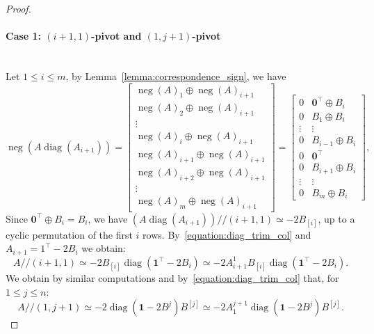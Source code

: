 \documentclass[11pt,a4paper]{amsart}
\renewcommand*{\leq}{\leqslant}
\theoremstyle{plain}
\theoremstyle{definition}
\newcommand{\trim}{/\!\!/}
\DeclareMathOperator{\diag}{diag}
\DeclareMathOperator{\nega}{neg}
\begin{document}
\begin{proof}
\paragraph*{\textbf{Case 1: $(i+1,1)$-pivot and $(1,j+1)$-pivot}}~\\
Let  $1\leq i\leq m$, by Lemma~\ref{lemma:correspondence_sign}, we have
$$\nega{(A\diag(A_{i+1}))} =\begin{bmatrix}
\nega{(A)}_1 \oplus \nega{(A)}_{i+1}\\
\nega{(A)}_2 \oplus \nega{(A)}_{i+1}\\
\vdots \\
\nega{(A)}_{i} \oplus \nega{(A)}_{i+1}\\
\nega{(A)}_{i+1} \oplus \nega{(A)}_{i+1}\\
\nega{(A)}_{i+2} \oplus \nega{(A)}_{i+1}\\
\vdots \\
\nega{(A)}_m \oplus \nega{(A)}_{i+1}
\end{bmatrix} = \begin{bmatrix}
0&\mathbf{0}^\top \oplus B_i\\
0& B_1 \oplus B_i\\
\vdots & \vdots \\
0& B_{i-1}\oplus B_i\\
0& \mathbf{0}^\top\\
0& B_{i+1} \oplus B_i\\
\vdots & \vdots \\
0 & B_m \oplus B_i
\end{bmatrix},$$
Since $\mathbf{0}^\top \oplus B_i=B_i$, we have $(A\diag(A_{i+1}))\trim (i+1,1) \simeq -2B_{[i]}$, up to a cyclic permutation of the first $i$ rows. By~\eqref{equation:diag_trim_col} and $A_{i+1} = 1^\top -2B_i$ we obtain: $$A\trim(i+1,1)\simeq-2B_{[i]}\diag(\mathbf{1}^\top-2B_i)\simeq-2 A_{i+1}^1 B_{[i]}\diag(\mathbf{1}^\top-2B_i).$$
We obtain by similar computations and by~\eqref{equation:diag_trim_col} that, for $1\leq j\leq n$: $$A\trim(1,j+1)\simeq-2\diag(\mathbf{1}-2B^j)B^{[j]}\simeq-2A_1^{j+1}\diag(\mathbf{1}-2B^j)B^{[j]}.$$
\medskip


\end{proof}
\end{document}
